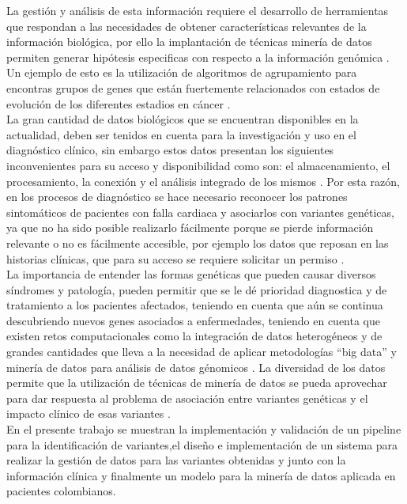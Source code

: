 La gestión y análisis de esta información requiere el desarrollo de herramientas que respondan a las necesidades de obtener características relevantes de la información biológica, por ello la implantación de técnicas minería de datos permiten generar hipótesis especificas con respecto a la información genómica \cite{Huttenhower2010}. Un ejemplo de esto es la utilización de algoritmos de agrupamiento para encontras grupos de genes que están fuertemente relacionados con estados de evolución de los diferentes estadios en cáncer \cite{Li2014}.\\

La gran cantidad de datos biológicos que se encuentran disponibles en la actualidad, deben ser tenidos en cuenta para la investigación y  uso en el diagnóstico clínico, sin embargo estos datos presentan los siguientes inconvenientes para su acceso y disponibilidad como son: el almacenamiento, el procesamiento, la conexión y el análisis integrado de los mismos \cite{Pabinger2014}. Por esta razón, en los procesos de diagnóstico se hace necesario reconocer los patrones  sintomáticos de pacientes con falla cardiaca y asociarlos con variantes genéticas, ya que no ha sido posible realizarlo fácilmente porque se pierde información relevante o no es fácilmente accesible, por ejemplo los datos que reposan en las historias clínicas, que para su acceso se requiere solicitar un permiso \cite{Pabinger2014}. \\

La importancia de entender las formas genéticas que pueden causar diversos síndromes y patología, pueden permitir que se le dé prioridad diagnostica y de tratamiento a los pacientes afectados, teniendo en cuenta que aún se continua descubriendo nuevos genes asociados a enfermedades, teniendo en cuenta que existen retos computacionales como la integración de datos heterogéneos y de grandes cantidades que lleva a la necesidad de aplicar metodologías “big data” y minería de datos para análisis de datos génomicos \cite{Maharjan2011,Hannah-Shmouni2015,Louie2007}. La diversidad de los datos permite que la utilización de técnicas de minería de datos se pueda aprovechar para dar respuesta al problema de asociación entre variantes genéticas y el impacto clínico de esas variantes \cite{Pabinger2014}.
\\


En el presente trabajo se muestran la implementación y validación de un pipeline para la identificación de variantes,el diseño e implementación de un sistema para realizar la gestión de datos para las variantes obtenidas y junto con la información clínica y finalmente un modelo para la  minería de datos aplicada en pacientes colombianos.\\
 
